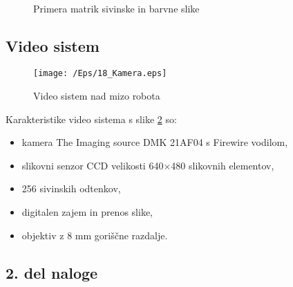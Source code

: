 \begin{figure}[h]
  \begin{center}
     \\
  \end{center}
  \vspace{-0.5cm}
  \caption{Primera matrik sivinske in barvne slike}
  \label{fMatrike}
\end{figure}


\vspace{0.0cm}
\subsection{Video sistem}
\vspace{0.3cm}


\begin{figure}[h]
    \center
    \texttt{[image: /Eps/18\_Kamera.eps]}
    \vspace{-0.3cm}
    \caption{Video sistem nad mizo robota}
    \label{fKamera}
\end{figure}

\noindent%
Karakteristike video sistema s slike \ref{fKamera} so:

\begin{itemize}
    \item \vspace*{-0.1cm} kamera The Imaging source DMK 21AF04 s Firewire vodilom, %
    \item \vspace*{-0.1cm} slikovni senzor CCD velikosti 640$\times$480 slikovnih elementov, %
    \item \vspace*{-0.1cm} 256 sivinskih odtenkov, %
    \item \vspace*{-0.1cm} digitalen zajem in prenos slike, %
    \item \vspace*{-0.1cm} objektiv z 8 mm goriščne razdalje. %
\end{itemize}



\subsection{2. del naloge }

